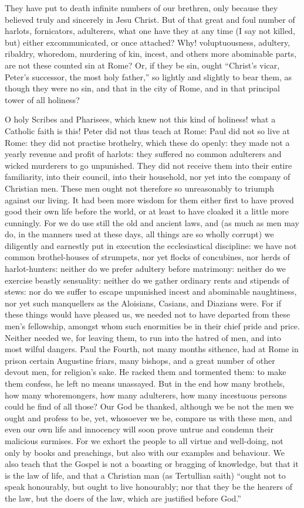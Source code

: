 They have put to death infinite numbers of our brethren, only because
they believed truly and sincerely in Jesu Christ. But of that
great and foul number of harlots, fornicators, adulterers, what one
have they at any time (I say not killed, but) either excommunicated,
or once attached? Why! voluptuousness, adultery, ribaldry, whoredom,
murdering of
kin, incest, and others more abominable parts, are not these counted
sin at Rome? Or, if they be sin, ought “Christ’s vicar,
Peter’s successor, the most holy father,” so lightly and
slightly to bear them, as though they were no sin, and that in the city
of Rome, and in that principal tower of all holiness?

O holy Scribes and Pharisees, which knew not this kind of holiness!
what a Catholic faith is this! Peter did not thus teach at Rome:
Paul did not so live at Rome: they did not practise brothelry, which
these do openly: they made not a yearly revenue and profit of harlots:
they suffered no common adulterers and wicked murderers to go unpunished.
They did not receive them into their entire familiarity, into their
council, into their household, nor yet into the company of Christian
men. These men ought not therefore so unreasonably to triumph
against our living. It had been more wisdom for them either first
to have proved good their own life before the world, or at least to
have cloaked it a little more cunningly. For we do use still the
old and ancient laws, and (as much as men may do, in the manners used
at these days, all things are so wholly corrupt) we diligently and earnestly
put in execution the ecclesiastical discipline: we have not common brothel-houses
of strumpets,
nor yet flocks of concubines, nor herds of harlot-hunters: neither do
we prefer adultery before matrimony: neither do we exercise beastly
sensuality: neither do we gather ordinary rents and stipends of stews:
nor do we suffer to escape unpunished incest and abominable naughtiness,
nor yet such manquellers as the Aloisians, Casians, and Diazians were.
For if these things would have pleased us, we needed not to have departed
from these men’s fellowship, amongst whom such enormities be in
their chief pride and price. Neither needed we, for leaving them,
to run into the hatred of men, and into most wilful dangers. Paul
the Fourth, not many months sithence, had at Rome in prison certain
Augustine friars, many bishops, and a great number of other devout men,
for religion’s sake. He racked them and tormented them:
to make them confess, he left no means unassayed. But in the end
how many brothels, how many whoremongers, how many adulterers, how many
incestuous persons could he find of all those? Our God be thanked,
although we be not the men we ought and profess to be, yet, whosoever
we be, compare us with these men, and even our own life and innocency
will soon prove untrue and condemn their malicious surmises. For
we exhort the people to all virtue and well-doing, not only by books
and preachings, but also with our examples and behaviour. We also
teach that the Gospel is not a boasting or bragging of knowledge, but
that it is the law of life, and that a Christian man (as Tertullian
saith) “ought not to speak honourably, but ought to live honourably;
nor that they be the hearers of the law, but the doers of the law, which
are justified before God.”

